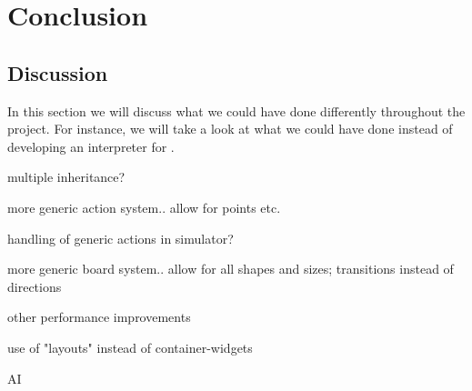 \chapter{Conclusion}
\label{chap:conclusion}
 
\section{Discussion}
\label{sec:discussion}

In this section we will discuss what we could have done differently throughout
the project. For instance, we will take a look at what we could have done
instead of developing an interpreter for \productname{}.














multiple inheritance?

more generic action system.. allow for points etc.

handling of generic actions in simulator?

more generic board system.. allow for all shapes and sizes; transitions instead
of directions

other performance improvements

use of "layouts" instead of container-widgets

AI